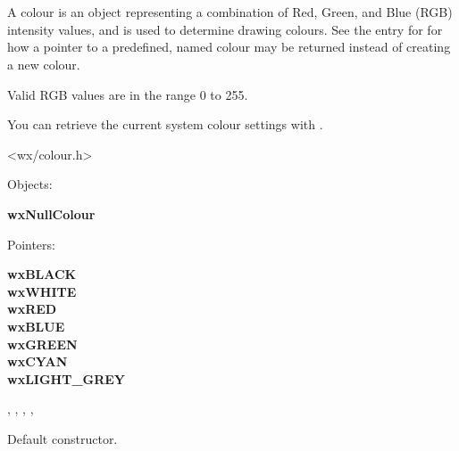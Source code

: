 
\section{}\label{wxcolour}

A colour is an object representing a combination of Red, Green, and Blue (RGB) intensity values,
and is used to determine drawing colours. See the
entry for  for how a pointer to a predefined,
named colour may be returned instead of creating a new colour.

Valid RGB values are in the range 0 to 255.

You can retrieve the current system colour settings with .




<wx/colour.h>


Objects:

{\bf wxNullColour}

Pointers:

{\bf wxBLACK\\
wxWHITE\\
wxRED\\
wxBLUE\\
wxGREEN\\
wxCYAN\\
wxLIGHT\_GREY}


, , ,\rtfsp
{}, 



\label{wxcolourconstr}


Default constructor.

